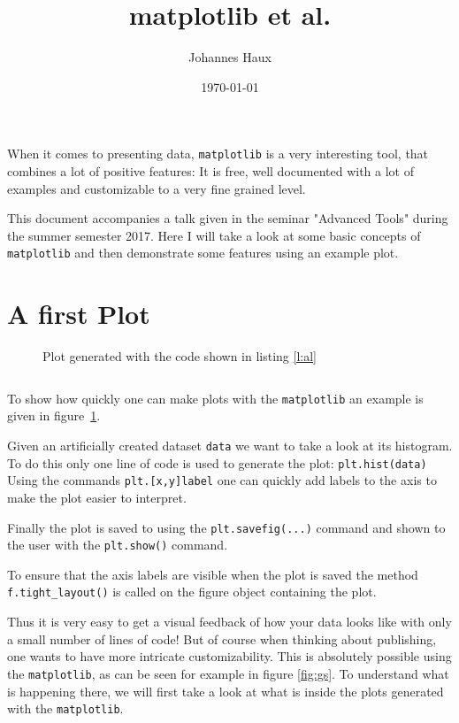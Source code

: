 \documentclass[a4paper, 11pt, twocolumn]{article}
\title{matplotlib et al.}
\author{Johannes Haux}
\date{\today}
\newcommand{\plotsample}[6][12cm]{
\begin{figure*}[h]
    
    \vspace{#2}
    \hspace{-1cm}
    \begin{minipage}[c][#1][t]{#3\textwidth} 
    \inputminted{python}{#4.py}
    \end{minipage}
    \hspace{0.5cm}
    \begin{minipage}[c][#1][t]{0.6\textwidth}
    \IfFileExists{#4.pgf}{
        
    }{
        \texttt{[image: \#4.png]}
    }
    \end{minipage}

\caption{#5}
\label{smpl:#6}
\end{figure*}
}
\newcommand{\mpl}{\texttt{matplotlib}\xspace}
\newcommand{\pl}[1]{\mbox{\texttt{#1}\xspace}}
\begin{document}
\maketitle


When it comes to presenting data, \mpl is a very interesting
tool, that combines a lot of positive features:
It is 
free,
well documented with a lot of examples and
customizable to a very fine grained level.

This document accompanies a talk given in the seminar "Advanced Tools" during
the summer semester 2017. Here I will take a look at some basic concepts of
\mpl and then demonstrate some features using an example plot.


\section{A first Plot}

\begin{figure}[h!]
\centering

\caption{Plot generated with the code shown in listing \ref{l:al}}
\label{fig:al}
\end{figure}

\begin{listing}[h!]
\inputminted{python}{axis_labels.py}
\caption{Code for figure \ref{fig:al}.}
\label{l:al}
\end{listing}

To show how quickly one can make plots with the \mpl an example
is given in \mbox{figure \ref{fig:al}}.

Given an artificially created dataset \pl{data} we want to take a look at its
histogram.
To do this only one line of code is used to generate the plot: 
\pl{plt.hist(data)}
Using the commands \pl{plt.[x,y]label} one can quickly add labels to the
axis to make the plot easier to interpret.

Finally the plot is saved to using the \pl{plt.savefig(...)} command and shown
to the user with the \pl{plt.show()} command.

To ensure that the axis labels are visible when the plot is saved the method
\pl{f.tight\_layout()} is called on the figure object containing the plot.

Thus it is very easy to get a visual feedback of how your data looks like with
only a small number of lines of code! But of course when thinking about publishing, one wants to have more intricate customizability. This is absolutely 
possible using the \mpl, as can be seen for example in figure \ref{fig:gs}.
To understand what is happening there, we will first take a look at what is 
inside the plots generated with the \mpl.
\end{document}
